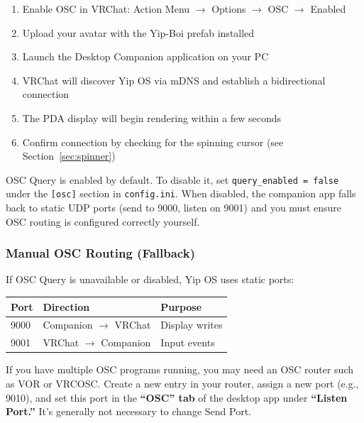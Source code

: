 \documentclass[10pt]{article}
\begin{document}
\begin{enumerate}[leftmargin=2em]
  \item Enable OSC in VRChat: Action Menu $\rightarrow$ Options $\rightarrow$ OSC $\rightarrow$ Enabled
  \item Upload your avatar with the Yip-Boi prefab installed
  \item Launch the Desktop Companion application on your PC
  \item VRChat will discover Yip OS via mDNS and establish a bidirectional connection
  \item The PDA display will begin rendering within a few seconds
  \item Confirm connection by checking for the spinning cursor (see Section~\ref{sec:spinner})
\end{enumerate}

\begin{notebox}
OSC Query is enabled by default. To disable it, set \texttt{query\_enabled = false} under the \texttt{[osc]} section in \texttt{config.ini}. When disabled, the companion app falls back to static UDP ports (send to 9000, listen on 9001) and you must ensure OSC routing is configured correctly yourself.
\end{notebox}

\subsubsection{Manual OSC Routing (Fallback)}

If OSC Query is unavailable or disabled, Yip OS uses static ports:

\begin{center}
{\small
\begin{tabular}{lll}
  \toprule
  \textbf{Port} & \textbf{Direction} & \textbf{Purpose} \\
  \midrule
  9000 & Companion $\rightarrow$ VRChat & Display writes \\
  9001 & VRChat $\rightarrow$ Companion & Input events \\
  \bottomrule
\end{tabular}
}
\end{center}

If you have multiple OSC programs running, you may need an OSC router such as VOR or VRCOSC. Create a new entry in your router, assign a new port (e.g., 9010), and set this port in the \textbf{``OSC'' tab} of the desktop app under \textbf{``Listen Port.''} It's generally not necessary to change Send Port.
\end{document}
